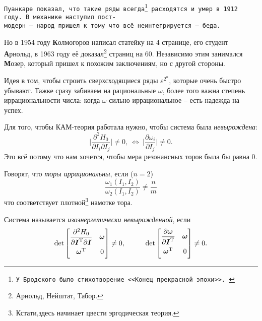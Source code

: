 \texttt{Пуанкаре показал, что такие ряды всегда\footnote{
    \texttt{У Бродского было стихотворение <<Конец прекрасной эпохи>>. } 
}  расходятся и умер в 1912 году. В механике наступил пост- \\модерн -- народ пришел к тому что всё неинтегрируется -- беда.} 


Но в 1954 году \textbf{К}олмогоров написал статейку на 4 странице, его студент \textbf{А}рнольд, в 1963 году её доказал\footnote{
    Арнольд, Нейштат, Табор.
}  страниц на 60. Независимо этим занимался \textbf{М}озер, который пришел к похожим заключениям, но с другой стороны. 

Идея в том, чтобы строить сверхсходящиеся ряды $\varepsilon^{2^n}$, которые очень быстро убывают. Тажке сразу забиваем на рациональные $\omega$, более того важна степень иррациональности числа: когда $\omega$ сильно иррациональное -- есть надежда на успех.

\begin{to_def}
    Для того, чтобы КАМ-теория работала нужно, чтобы система была \textit{невырождена}:
    \begin{equation*}
        \bigg|
            \frac{\partial^2 H_0}{\partial I_i \partial I_j} 
        \bigg| \neq 0, \ \Leftrightarrow \ \bigg|
            \frac{\partial \omega_i}{\partial I_j} 
        \bigg| \neq 0.
    \end{equation*}
    Это всё потому что нам хочется, чтобы мера резонансных торов была бы равна 0. 
\end{to_def}

\begin{to_def}
    Говорят, что \textit{торы иррациональны}, если ($n=2$)
    \begin{equation*}
        \frac{\omega_1 (I_1, I_2)}{\omega_2 (I_1, I_2)} \neq \frac{n}{m}
    \end{equation*}
    что соответствует плотной\footnote{
        Кстати,здесь начинает цвести эргодическая теория.
    }  намотке тора. 
\end{to_def}


\begin{to_def}
    Система называется \textit{изоэнергетически невырожденной}, если
    \begin{equation*}
        \det \begin{bmatrix}
        \vphantom{\dfrac{1}{2}}
            \dfrac{\partial^2 H_0}{\partial \vc{I}\T \partial \vc{I}} & \vc{\omega} \\
        \vphantom{\dfrac{1}{2}}
            \vc{\omega}\T & 0
        \end{bmatrix} \neq 0,
\hspace{10 mm}
        \det \begin{bmatrix}
        \vphantom{\dfrac{1}{2}}
            \dfrac{\partial \vc{\omega} }{\partial \vc{I}\T } & \vc{\omega} \\
        \vphantom{\dfrac{1}{2}}
            \vc{\omega}\T & 0
        \end{bmatrix} \neq 0.
    \end{equation*}
\end{to_def}



